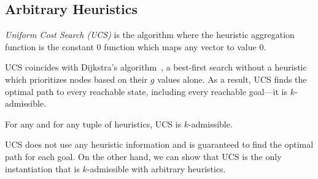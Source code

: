 \subsection{Arbitrary Heuristics}

\begin{definition}
  \label{def:ucs}
  \emph{Uniform Cost Search (UCS)} is the  algorithm where the heuristic aggregation function is the constant 0 function which maps any vector to value 0.
\end{definition}

UCS coincides with Dijkstra's algorithm~\cite{DIJ59,SoCS2011Felner}, a best-first search without a heuristic which prioritizes nodes based on their $g$ values alone.
As a result, UCS finds the optimal path to every reachable state, including every reachable goal---it is $k$-admissible.

\begin{theorem}
  \label{thm:arbitrary}
  For any \kgs and for any tuple of heuristics, UCS is $k$-admissible.
\end{theorem}

UCS does not use any heuristic information and is guaranteed to find the optimal path for each goal.
On the other hand, we can show that UCS is the only \kastar instantiation that is $k$-admissible with arbitrary heuristics.

